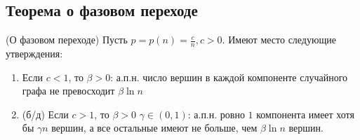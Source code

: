 
\subsection{Теорема о фазовом переходе}

\begin{theorem}(О фазовом переходе)
    Пусть $p = p(n) = \frac{c}{n}, c >0.$ Имеют место следующие утверждения:

    \begin{enumerate}
        \item Если $c < 1$, то \exists $\beta > 0$: а.п.н. число вершин в каждой компоненте случайного графа не превосходит $\beta \ln{n}$
        \item(б/д) Если $c > 1$, то \exists $\beta > 0$ \exists $\gamma \in (0,1)$: а.п.н. ровно $1$ компонента имеет хотя бы $\gamma n $ вершин, а все остальные имеют не больше, чем $\beta \ln{n}$ вершин.
    \end{enumerate}
    
\end{theorem}

